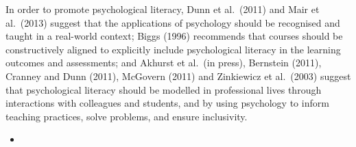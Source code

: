 \documentclass[
  11pt,
  letterpaper,
  oneside,
  open=any]{scrbook}
\begin{document}
In order to promote psychological literacy, Dunn et al.~(2011) and Mair
et al.~(2013) suggest that the applications of psychology should be
recognised and taught in a real-world context; Biggs (1996) recommends
that courses should be constructively aligned to explicitly include
psychological literacy in the learning outcomes and assessments; and
Akhurst et al.~(in press), Bernstein (2011), Cranney and Dunn (2011),
McGovern (2011) and Zinkiewicz et al.~(2003) suggest that psychological
literacy should be modelled in professional lives through interactions
with colleagues and students, and by using psychology to inform teaching
practices, solve problems, and ensure inclusivity.

\begin{itemize}
\item
  \begin{tcolorbox}[enhanced jigsaw, rightrule=.15mm, opacitybacktitle=0.6, colbacktitle=quarto-callout-note-color!10!white, breakable, leftrule=.75mm, bottomtitle=1mm, toptitle=1mm, colback=white, titlerule=0mm, opacityback=0, title=\textcolor{quarto-callout-note-color}{\faInfo}\hspace{0.5em}{Note}, arc=.35mm, bottomrule=.15mm, toprule=.15mm, left=2mm, coltitle=black]


\end{tcolorbox}
\end{itemize}
\end{document}
